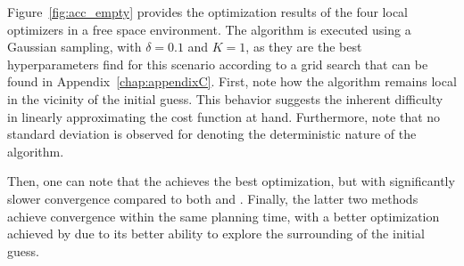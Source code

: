Figure~\ref{fig:acc_empty} provides the optimization results of the four local optimizers in a free space environment.
The  algorithm is executed using a Gaussian sampling, with $\delta = 0.1$ and $K = 1$, as they are the best hyperparameters find for this scenario according to a grid search that can be found in Appendix~\ref{chap:appendixC}.
First, note how the  algorithm remains local in the vicinity of the initial guess.
This behavior suggests the inherent difficulty in linearly approximating the cost function at hand.
Furthermore, note that no standard deviation is observed for  denoting the deterministic nature of the algorithm.

Then, one can note that the  achieves the best optimization, but with significantly slower convergence compared to both  and .
Finally, the latter two methods achieve convergence within the same planning time, with a better optimization achieved by  due to its better ability to explore the surrounding of the initial guess.


